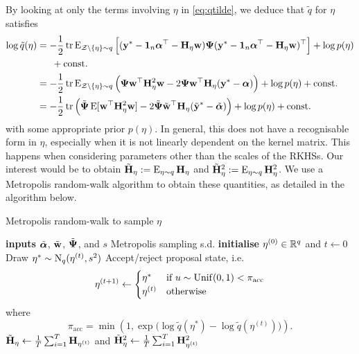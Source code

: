 By looking at only the terms involving $\eta$ in \cref{eq:qtilde}, we deduce that $\tilde q$ for $\eta$ satisfies
\begin{align*}
  \log\tilde q(\eta) 
  &=  -\frac{1}{2}\operatorname{tr}\operatorname{E}_{{\mathcal Z}\backslash\{\eta\}\sim q} \Big[ 
  ({\mathbf y}^* - {\mathbf 1}_n{\bm\alpha}^\top - {\mathbf H}_\eta{\mathbf w}) {\bm\Psi} ({\mathbf y}^* - {\mathbf 1}_n{\bm\alpha}^\top - {\mathbf H}_\eta{\mathbf w})^\top \Big] + \log p(\eta) \\
  &\phantom{==} + \text{const.}\hspace{0.01em} \\
  &=  -\frac{1}{2}\operatorname{tr} \operatorname{E}_{{\mathcal Z}\backslash\{\eta\}\sim q} \Big(
  {\bm\Psi}{\mathbf w}^\top{\mathbf H}_\eta^2{\mathbf w} - 2{\bm\Psi}{\mathbf w}^\top{\mathbf H}_\eta({\mathbf y}^*-{\bm\alpha})
  \Big) + \log p(\eta)  + \text{const.}\hspace{0.01em} \\
  &= -\frac{1}{2} \operatorname{tr} \Big( 
   \tilde{{\bm\Psi}} \operatorname{E}[{\mathbf w}^\top{\mathbf H}_\eta^2{\mathbf w}] - 2\tilde{{\bm\Psi}}\tilde{{\mathbf w}}^\top{\mathbf H}_\eta(\tilde{{\mathbf y}}^* - \tilde{{\bm\alpha}})
   \Big) + \log p(\eta) + \text{const.}\hspace{0.01em}
\end{align*}
with some appropriate prior $p(\eta)$.
In general, this does not have a recognisable form in $\eta$, especially when it is not linearly dependent on the kernel matrix.
This happens when considering parameters other than the scales of the RKHSs.
Our interest would be to obtain $\tilde{{\mathbf H}}_\eta := \operatorname{E}_{\eta\sim q}{\mathbf H}_\eta$ and $\tilde{{\mathbf H}}_\eta^2 := \operatorname{E}_{\eta\sim q}{\mathbf H}_\eta^2$.
We use a Metropolis random-walk algorithm to obtain these quantities, as detailed in the algorithm below.

\begin{algorithm}[hbt]
\caption{Metropolis random-walk to sample $\eta$}
\begin{algorithmic}[1]
  \State \textbf{inputs} $\tilde{{\bm\alpha}}$, $\tilde{{\mathbf w}}$, $\tilde{{\bm\Psi}}$, and  $s$ Metropolis sampling s.d.
  \State \textbf{initialise} $\eta^{(0)} \in \mathbb{R}^q$ and $t \gets 0$
    \State Draw $\eta^* \sim \operatorname{N}_q(\eta^{(t)}, s^2)$
    \State Accept/reject proposal state, i.e.
    \[
      \eta^{(t+1)} \gets 
      \begin{cases}
        \eta^* &\text{if } u\sim\operatorname{Unif}(0,1) < \pi_{\text{acc}} \\
        \eta^{(t)} &\text{otherwise}       
      \end{cases}
    \]
    \hspace{1.8em}where
    \[
      \pi_{\text{acc}} = \min\left(1, 
      \exp\big(\log \tilde q(\eta^*) - \log \tilde q(\eta^{(t)})\big)
      \right).
    \]
  \EndFor
  \State $\tilde{{\mathbf H}}_\eta \gets \frac{1}{T}\sum_{i=1}^T {\mathbf H}_{\eta^{(t)}}$ and $\tilde{{\mathbf H}}_\eta^2 \gets \frac{1}{T}\sum_{i=1}^T {\mathbf H}_{\eta^{(t)}}^2$
\end{algorithmic}
\end{algorithm}

